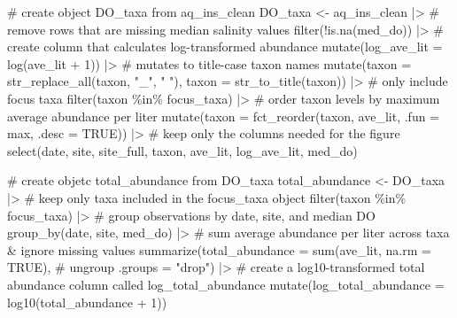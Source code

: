 \documentclass[
  letterpaper,
  DIV=11,
  numbers=noendperiod]{scrartcl}
\newenvironment{Shaded}{\begin{snugshade}}{\end{snugshade}}
\newcommand{\AttributeTok}[1]{\textcolor[rgb]{0.40,0.45,0.13}{#1}}
\newcommand{\CommentTok}[1]{\textcolor[rgb]{0.37,0.37,0.37}{#1}}
\newcommand{\ConstantTok}[1]{\textcolor[rgb]{0.56,0.35,0.01}{#1}}
\newcommand{\DecValTok}[1]{\textcolor[rgb]{0.68,0.00,0.00}{#1}}
\newcommand{\FunctionTok}[1]{\textcolor[rgb]{0.28,0.35,0.67}{#1}}
\newcommand{\NormalTok}[1]{\textcolor[rgb]{0.00,0.23,0.31}{#1}}
\newcommand{\OtherTok}[1]{\textcolor[rgb]{0.00,0.23,0.31}{#1}}
\newcommand{\SpecialCharTok}[1]{\textcolor[rgb]{0.37,0.37,0.37}{#1}}
\newcommand{\StringTok}[1]{\textcolor[rgb]{0.13,0.47,0.30}{#1}}
\begin{document}
\begin{Shaded}
\begin{Highlighting}[]
\CommentTok{\# create object DO\_taxa from aq\_ins\_clean}
\NormalTok{DO\_taxa }\OtherTok{\textless{}{-}}\NormalTok{ aq\_ins\_clean }\SpecialCharTok{|\textgreater{}} 
  \CommentTok{\# remove rows that are missing median salinity values}
  \FunctionTok{filter}\NormalTok{(}\SpecialCharTok{!}\FunctionTok{is.na}\NormalTok{(med\_do)) }\SpecialCharTok{|\textgreater{}} 
  \CommentTok{\# create column that calculates log{-}transformed abundance}
  \FunctionTok{mutate}\NormalTok{(}\AttributeTok{log\_ave\_lit =} \FunctionTok{log}\NormalTok{(ave\_lit }\SpecialCharTok{+} \DecValTok{1}\NormalTok{)) }\SpecialCharTok{|\textgreater{}}
  \CommentTok{\# mutates to title{-}case taxon names}
  \FunctionTok{mutate}\NormalTok{(}\AttributeTok{taxon =} \FunctionTok{str\_replace\_all}\NormalTok{(taxon, }\StringTok{"\_"}\NormalTok{, }\StringTok{" "}\NormalTok{), }\AttributeTok{taxon =} \FunctionTok{str\_to\_title}\NormalTok{(taxon)) }\SpecialCharTok{|\textgreater{}}
  \CommentTok{\# only include focus taxa}
  \FunctionTok{filter}\NormalTok{(taxon }\SpecialCharTok{\%in\%}\NormalTok{ focus\_taxa) }\SpecialCharTok{|\textgreater{}} 
  \CommentTok{\# order taxon levels by maximum average abundance per liter}
  \FunctionTok{mutate}\NormalTok{(}\AttributeTok{taxon =} \FunctionTok{fct\_reorder}\NormalTok{(taxon, ave\_lit, }\AttributeTok{.fun =}\NormalTok{ max, }\AttributeTok{.desc =} \ConstantTok{TRUE}\NormalTok{)) }\SpecialCharTok{|\textgreater{}} 
  \CommentTok{\# keep only the columns needed for the figure}
  \FunctionTok{select}\NormalTok{(date, site, site\_full, taxon, ave\_lit, log\_ave\_lit, med\_do)}

\CommentTok{\# create objetc total\_abundance from DO\_taxa}
\NormalTok{total\_abundance }\OtherTok{\textless{}{-}}\NormalTok{ DO\_taxa }\SpecialCharTok{|\textgreater{}}
  \CommentTok{\# keep only taxa included in the focus\_taxa object}
  \FunctionTok{filter}\NormalTok{(taxon }\SpecialCharTok{\%in\%}\NormalTok{ focus\_taxa) }\SpecialCharTok{|\textgreater{}}
  \CommentTok{\# group observations by date, site, and median DO}
  \FunctionTok{group\_by}\NormalTok{(date, site, med\_do) }\SpecialCharTok{|\textgreater{}}
  \CommentTok{\# sum average abundance per liter across taxa \& ignore missing values}
  \FunctionTok{summarize}\NormalTok{(}\AttributeTok{total\_abundance =} \FunctionTok{sum}\NormalTok{(ave\_lit, }\AttributeTok{na.rm =} \ConstantTok{TRUE}\NormalTok{),}
            \CommentTok{\# ungroup}
            \AttributeTok{.groups =} \StringTok{"drop"}\NormalTok{) }\SpecialCharTok{|\textgreater{}}
  \CommentTok{\# create a log10{-}transformed total abundance column called log\_total\_abundance}
  \FunctionTok{mutate}\NormalTok{(}\AttributeTok{log\_total\_abundance =} \FunctionTok{log10}\NormalTok{(total\_abundance }\SpecialCharTok{+} \DecValTok{1}\NormalTok{))}


\end{Highlighting}
\end{Shaded}
\end{document}
